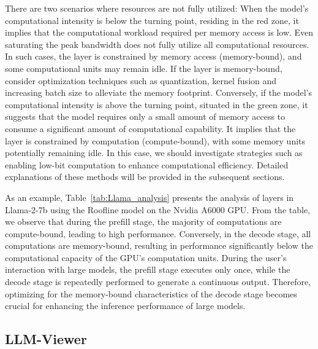 There are two scenarios where resources are not fully utilized: When the model's computational intensity is below the turning point, residing in the red zone, it implies that the computational workload required per memory access is low. Even saturating the peak bandwidth does not fully utilize all computational resources. In such cases, the layer is constrained by memory access (memory-bound), and some computational units may remain idle.
If the layer is memory-bound, consider optimization techniques such as quantization, kernel fusion and increasing batch size to alleviate the memory footprint. 
Conversely, if the model's computational intensity is above the turning point, situated in the green zone, it suggests that the model requires only a small amount of memory access to consume a significant amount of computational capability. It implies that the layer is constrained by computation (compute-bound), with some memory units potentially remaining idle.
In this case, we should investigate strategies such as enabling low-bit computation to enhance computational efficiency. 
Detailed explanations of these methods will be provided in the subsequent sections.


As an example, Table~\ref{tab:Llama_analysis} presents the analysis of layers in Llama-2-7b using the Roofline model on the Nvidia A6000 GPU.
From the table, we observe that during the prefill stage, the majority of computations are compute-bound, leading to high performance. 
Conversely, in the decode stage, all computations are memory-bound, resulting in performance significantly below the computational capacity of the GPU's computation units.
During the user's interaction with large models, the prefill stage executes only once, while the decode stage is repeatedly performed to generate a continuous output. Therefore, optimizing for the memory-bound characteristics of the decode stage becomes crucial for enhancing the inference performance of large models.


\subsection{LLM-Viewer}
\label{sec:llmviewer}

